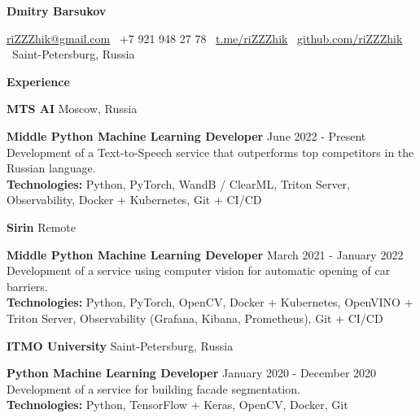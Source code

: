 \documentclass[11pt]{article}
\begin{document}
\begin{center}
    \textbf{Dmitry Barsukov}\\
    \hrulefill
\end{center}

\begin{center}
    \href{mailto:riZZZhik@gmail.com}{riZZZhik@gmail.com} \textbullet \ +7 921 948 27 78 \textbullet \ \href{https://t.me/riZZZhik}{t.me/riZZZhik} \textbullet \ \href{https://github.com/riZZZhik}{github.com/riZZZhik} \textbullet \ Saint-Petersburg, Russia
\end{center}

\vspace{0.5pt}

\begin{center}
    \textbf{Experience}
\end{center}

\textbf{MTS AI} \hfill Moscow, Russia

\textbf{Middle Python Machine Learning Developer} \hfill June 2022 - Present \\[2ex]
Development of a Text-to-Speech service that outperforms top competitors in the Russian language. \\
\textbf{Technologies:} Python, PyTorch, WandB / ClearML, Triton Server, Observability, Docker + Kubernetes, Git + CI/CD

\vspace{12pt}

\textbf{Sirin} \hfill Remote

\textbf{Middle Python Machine Learning Developer} \hfill March 2021 - January 2022 \\[2ex]
Development of a service using computer vision for automatic opening of car barriers. \\
\textbf{Technologies:} Python, PyTorch, OpenCV, Docker + Kubernetes, OpenVINO + Triton Server, Observability (Grafana, Kibana, Prometheus), Git + CI/CD

\vspace{12pt}

\textbf{ITMO University} \hfill Saint-Petersburg, Russia

\textbf{Python Machine Learning Developer} \hfill January 2020 - December 2020 \\[2ex]
Development of a service for building facade segmentation. \\
\textbf{Technologies:} Python, TensorFlow + Keras, OpenCV, Docker, Git

\vspace{12pt}
\end{document}
